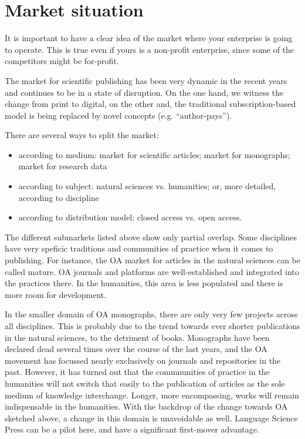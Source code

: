 \documentclass[nonflat,smallfont
]{langsci/langscibook}
\newcommand{\background}[1]{ 
  \vspace{5mm}
  \renewcommand{\tblslinecolour}{lsDarkBlue}
  \tblssy[red]{explore2}{Background}{\vspace*{-5mm}#1}
}
\newcommand{\langscisolution}[1]{
  \renewcommand{\tblslinecolour}{lsLightBlue}
  \tblssy{langsci}{LangSci solution}{\vspace*{-5mm}#1}
}
\renewcommand{\tblssy}[4][black!12]{%
  \renewcommand{\langscisymbol}{#2}\renewcommand{\tblsboxcolor}{#1}
  \begin{mdframed}[style=yellowexercise,frametitle={#3}]
    #4
  \end{mdframed}
}
\begin{document}
\section{Market situation}
\vspace*{5mm}\background{It is important to have a clear idea of the market where your enterprise is going to operate. This is true even if yours is a non-profit enterprise, since some of the competitors might be for-profit. }
\langscisolution{
The market for scientific publishing has been very dynamic in the recent years and continues to be in a state of disruption. On the one hand, we witness the change from print to digital, on the other and, the traditional subscription-based model is being replaced by novel concepts (e.g. ``author-pays''). 

There are several ways to split the market: 
\begin{itemize}
\sloppy
 \item according to medium: market for scientific articles; market for monographs; market for research data
 \item according to subject: natural sciences vs. humanities; or, more detailed, according to discipline
 \item according to distribution model: closed access vs. open access.
\end{itemize}
 
The different submarkets listed above show only partial overlap. Some disciplines have very speficic traditions and communities of practice when it comes to publishing. For instance, the OA market for articles in the natural sciences can be called mature. OA journals and platforms are well-established and integrated into the practices there. In the humanities, this area is less populated and there is more room for development.

In the smaller domain of OA monographs, there are only very few projects across all disciplines. This is probably due to the trend towards ever shorter publications in the natural sciences, to the detriment of books. Monographs have been declared dead several times over the course of the last years, and the OA movement has focussed nearly exclusively on journals and repositories in the past. However, it has turned out that the commnunities of practice in the humanities will not switch that easily to the publication of articles as the sole medium of knowledge interchange. Longer, more encompassing, works will remain indispensable in the humanities. With the backdrop of the change towards OA sketched above, a change in this domain is unavoidable as well. Language Science Press can be a pilot here, and have a significant first-mover advantage. 
}
\end{document}
